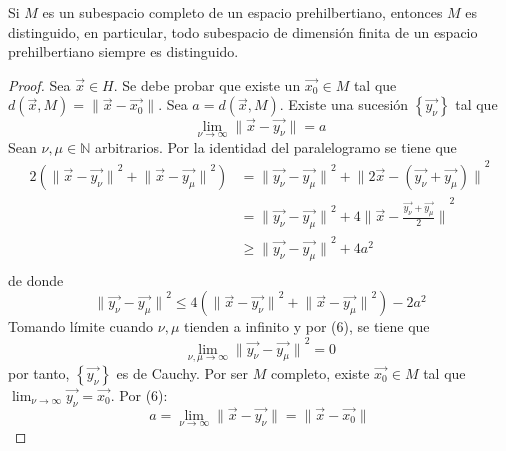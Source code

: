 \documentclass[12pt]{report}
\theoremstyle{largebreak}
\newcommand\norm[1]{\ensuremath{\|#1\|}}
\begin{document}
    \begin{theor}
        Si $M$ es un subespacio completo de un espacio prehilbertiano, entonces $M$ es distinguido, en particular, todo subespacio de dimensión finita de un espacio prehilbertiano siempre es distinguido. 
    \end{theor}

    \begin{proof}
        Sea $\vec{x}\in H$. Se debe probar que existe un $\vec{x_0}\in M$ tal que $d(\vec{x},M)=\norm{\vec{x}-\vec{x_0}}$. Sea $a=d(\vec{x},M)$. Existe una sucesión $\left\{\vec{y_\nu} \right\}$ tal que
        \begin{equation}
            \lim_{\nu\rightarrow\infty}\norm{\vec{x}-\vec{y_\nu}}=a
        \end{equation}
        Sean $\nu,\mu\in\mathbb{N}$ arbitrarios. Por la identidad del paralelogramo se tiene que
        \begin{equation*}
            \begin{split}
                2\left(\norm{\vec{x}-\vec{y_\nu}}^2+\norm{\vec{x}-\vec{y_\mu}}^2 \right)
                &=\norm{\vec{y_\nu}-\vec{y_\mu}}^2+\norm{2\vec{x}-(\vec{y_\nu}+\vec{y_\mu})}^2\\
                &=\norm{\vec{y_\nu}-\vec{y_\mu}}^2+4\norm{\vec{x}-\frac{\vec{y_\nu}+\vec{y_\mu}}{2}}^2\\
                &\geq\norm{\vec{y_\nu}-\vec{y_\mu}}^2+4a^2\\
            \end{split}
        \end{equation*}
        de donde
        \begin{equation*}
            \norm{\vec{y_\nu}-\vec{y_\mu}}^2\leq4\left(\norm{\vec{x}-\vec{y_\nu}}^2+\norm{\vec{x}-\vec{y_\mu}}^2 \right)-2a^2
        \end{equation*}
        Tomando límite cuando $\nu,\mu$ tienden a infinito y por (6), se tiene que
        \begin{equation*}
            \lim_{\nu,\mu\rightarrow\infty}\norm{\vec{y_\nu}-\vec{y_\mu}}^2=0
        \end{equation*}
        por tanto, $\left\{\vec{y_\nu} \right\}$ es de Cauchy. Por ser $M$ completo, existe $\vec{x_0}\in M$ tal que $\lim_{\nu\rightarrow\infty}\vec{y_\nu}=\vec{x_0}$. Por (6):
        \begin{equation*}
            a=\lim_{\nu\rightarrow\infty}\norm{\vec{x}-\vec{y_\nu}}=\norm{\vec{x}-\vec{x_0}}
        \end{equation*}
    \end{proof}
\end{document}
